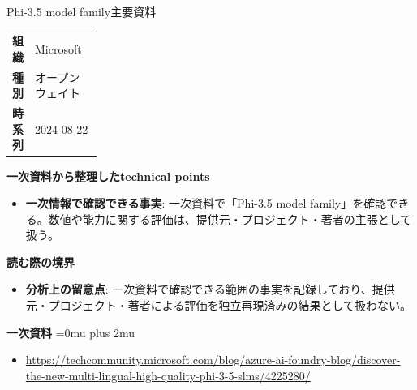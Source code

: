 \begin{technicalnote}{Phi-3.5 model family}{主要資料}
\begingroup
\begin{tabularx}{\linewidth}{@{}>{\bfseries}p{0.22\linewidth}X@{}}
組織 & Microsoft \\
種別 & オープンウェイト \\
時系列 & 2024-08-22 \\
\end{tabularx}
\smallskip
{\bfseries 一次資料から整理したtechnical points}
\begin{itemize}[leftmargin=1.5em,itemsep=0.35em]
\item \textbf{一次情報で確認できる事実}: 一次資料で「Phi-3.5 model family」を確認できる。数値や能力に関する評価は、提供元・プロジェクト・著者の主張として扱う。
\end{itemize}
\begin{minipage}{\linewidth}
{\bfseries 読む際の境界}
\begin{itemize}[leftmargin=1.5em,itemsep=0.35em]
\item \textbf{分析上の留意点}: 一次資料で確認できる範囲の事実を記録しており、提供元・プロジェクト・著者による評価を独立再現済みの結果として扱わない。
\end{itemize}
\begin{samepage}
{\bfseries 一次資料}
\begingroup\sloppy
\Urlmuskip=0mu plus 2mu\relax
\begin{itemize}[leftmargin=1.5em,itemsep=0.25em]
\item {\scriptsize\url{https://techcommunity.microsoft.com/blog/azure-ai-foundry-blog/discover-the-new-multi-lingual-high-quality-phi-3-5-slms/4225280/}}
\end{itemize}
\endgroup
\end{samepage}
\end{minipage}
\endgroup
\end{technicalnote}
\medskip

